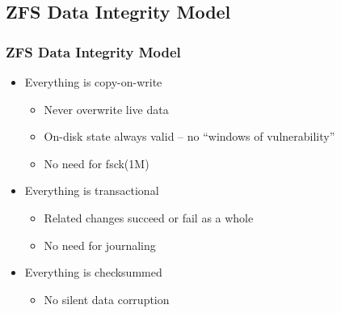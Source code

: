 \subsection{ZFS Data Integrity Model} %
\begin{frame}[fragile]
    \frametitle{ZFS Data Integrity Model}
    \begin{itemize}
        \item Everything is copy-on-write
        \begin{itemize}
            \item Never overwrite live data
            \item On-disk state always valid – no “windows of vulnerability”
            \item No need for fsck(1M)
        \end{itemize} \pause
        \item Everything is transactional
        \begin{itemize}
            \item Related changes succeed or fail as a whole
            \item No need for journaling
        \end{itemize} \pause
        \item Everything is checksummed
        \begin{itemize}
            \item No silent data corruption
        \end{itemize}
    \end{itemize}
\end{frame}
% 
% 
% 
% 
% 
